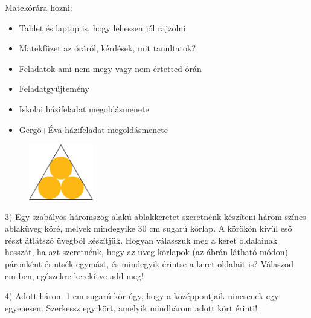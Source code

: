 \documentclass[a4paper,12pt]{article}
\begin{document}
Matekórára hozni:
\begin{itemize}
\item Tablet és laptop is, hogy lehessen jól rajzolni
\item Matekfüzet az óráról, kérdések, mit tanultatok?
\item Feladatok ami nem megy vagy nem értetted órán
\item Feladatgyűjtemény
\item Iskolai házifeladat megoldásmenete
\item Gergő+Éva házifeladat megoldásmenete
\end{itemize}

\renewcommand{\arraystretch}{1.5}


\begin{figure}
  \vspace{-0.5cm}
  \includegraphics[width=0.25\textwidth]{abra}
\end{figure}

3) Egy szabályos háromszög alakú ablakkeretet szeretnénk készíteni
három színes ablaküveg köré, melyek mindegyike 30 cm sugarú körlap. A
körökön kívül eső részt átlátszó üvegből készítjük. Hogyan válasszuk
meg a keret oldalainak hosszát, ha azt szeretnénk, hogy az üveg
körlapok (az ábrán látható módon) páronként érintsék egymást, és
mindegyik érintse a keret oldalait is? Válaszod cm-ben, egészekre
kerekítve add meg!

4) Adott három 1 cm sugarú kör úgy, hogy a középpontjaik nincsenek egy
egyenesen. Szerkessz egy kört, amelyik mindhárom adott kört érinti!
\end{document}
